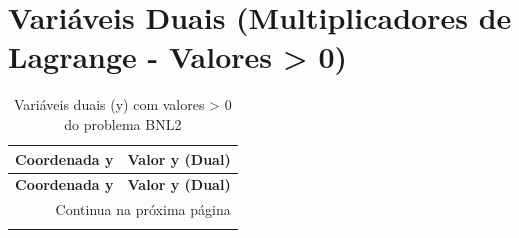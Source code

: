 \documentclass[12pt]{article}
\begin{document}
\section{Variáveis Duais (Multiplicadores de Lagrange - Valores > 0)}

\begin{longtable}{@{}cc@{}}
\caption{Variáveis duais (y) com valores > 0 do problema BNL2} \\
\toprule
\textbf{Coordenada y} & \textbf{Valor y (Dual)} \\
\midrule
\endfirsthead

\toprule
\textbf{Coordenada y} & \textbf{Valor y (Dual)} \\
\midrule
\endhead

\midrule \multicolumn{2}{r}{{Continua na próxima página}} \\ \midrule
\endfoot


\end{longtable}
\end{document}

